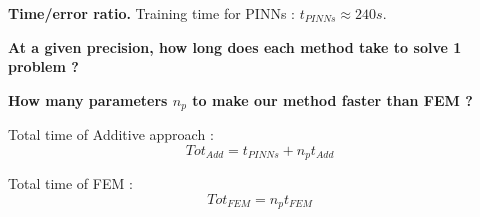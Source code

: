 \begin{columns}
{\begin{center}
\begin{tcolorbox}
                \vspace{5pt}
                
                \hspace{20pt}\begin{minipage}{0.05\linewidth}
                    \normalsize
                    \flushright
                \end{minipage}
                \begin{minipage}{0.8\linewidth}
                    \centering
                \end{minipage} 
            \end{tcolorbox}

            \begin{tcolorbox}[
                colback=color1!50, %
                colframe=color2, %
                arc=2mm, %
                boxrule=2pt, %
                breakable, enhanced jigsaw,
                width=\linewidth
                ]            
                \textbf{Time/error ratio.} Training time for PINNs : $t_{PINNs}\approx 240s$.

                \vspace{10pt}

                 \textbf{At a given precision, how long does each method take to solve 1 problem ?}

                \begin{center}
                \end{center}

                \vspace{10pt}

                 \textbf{How many parameters $n_p$ to make our method faster than FEM ?}

                \vspace{10pt}

                \begin{minipage}{0.48\linewidth}
                    Total time of Additive approach :
                    \vspace{-5pt}
                    $$Tot_{Add}=t_{PINNs}+n_p t_{Add}$$
                \end{minipage}
                \begin{minipage}{0.48\linewidth}
                    Total time of FEM :
                    \vspace{-5pt}
                    $$Tot_{FEM}=n_p t_{FEM}$$
                \end{minipage}


\end{tcolorbox}
\end{center}}
\end{columns}
